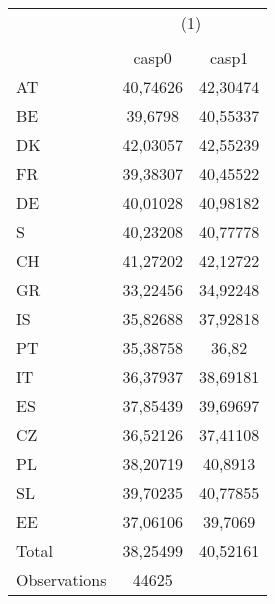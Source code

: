 {
\def\sym#1{\ifmmode^{#1}\else\(^{#1}\)\fi}
\begin{tabular}{l*{1}{cc}}
\hline\hline
                    &\multicolumn{2}{c}{(1)}  \\
                    &\multicolumn{2}{c}{}     \\
                    &       casp0&       casp1\\
\hline
AT                  &    40,74626&    42,30474\\
BE                  &     39,6798&    40,55337\\
DK                  &    42,03057&    42,55239\\
FR                  &    39,38307&    40,45522\\
DE                  &    40,01028&    40,98182\\
S                   &    40,23208&    40,77778\\
CH                  &    41,27202&    42,12722\\
GR                  &    33,22456&    34,92248\\
IS                  &    35,82688&    37,92818\\
PT                  &    35,38758&       36,82\\
IT                  &    36,37937&    38,69181\\
ES                  &    37,85439&    39,69697\\
CZ                  &    36,52126&    37,41108\\
PL                  &    38,20719&     40,8913\\
SL                  &    39,70235&    40,77855\\
EE                  &    37,06106&     39,7069\\
Total               &    38,25499&    40,52161\\
\hline
Observations        &       44625&            \\
\hline\hline
\end{tabular}
}

